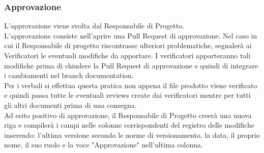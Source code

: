 \subsubsection{Approvazione}
L’approvazione viene svolta dal Responsabile di Progetto.\\
L'approvazione consiste nell'aprire una Pull Request di approvazione. Nel caso in cui il Responsabile di progetto riscontrasse ulteriori problematiche, segnalerà ai Verificatori le eventuali modifiche da apportare. I verificatori apporteranno tali modifiche prima di chiudere la Pull Request di approvazione e quindi di integrare i cambiamenti nel branch documentation.\\
Per i verbali si effettua questa pratica non appena il file prodotto viene verificato e quindi passa tutte le eventuali reviews create dai verificatori mentre per tutti gli altri documenti prima di una consegna.\\
Ad esito positivo di approvazione, il Responsabile di Progetto creerà una nuova riga e compilerà i campi nelle colonne corrispondenti del registro delle modifiche inserendo: l'ultima versione secondo le norme di versionamento, la data, il proprio nome, il suo ruolo e la voce "Approvazione" nell'ultima colonna.
